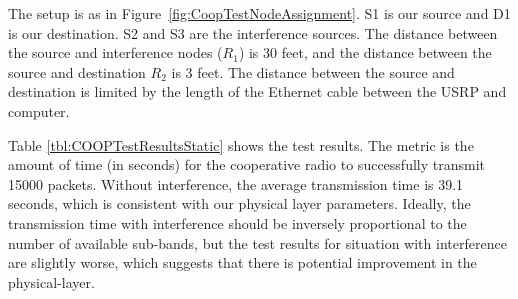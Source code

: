 The setup is as in Figure~\ref{fig:CoopTestNodeAssignment}. S1 is our source and D1 is our destination. S2 and S3 are the interference sources. The distance between the source and interference nodes ($R_1$) is 30 feet, and the distance between the source and destination $R_2$ is 3 feet. The distance between the source and destination is limited by the length of the Ethernet cable between the USRP and computer.

Table \ref{tbl:COOPTestResultsStatic} shows the test results. The metric is the amount of time (in seconds) for the cooperative radio to successfully transmit 15000 packets. Without interference, the average transmission time is 39.1 seconds, which is consistent with our physical layer parameters. Ideally, the transmission time with interference should be inversely proportional to the number of available sub-bands, but the test results for situation with interference are slightly worse, which suggests that there is potential improvement in the physical-layer.

